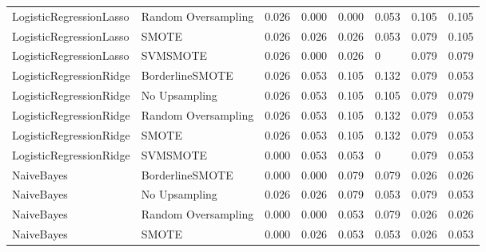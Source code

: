 \begin{tabular}{llllllll}
     LogisticRegressionLasso & Random Oversampling & 0.026 &                     0.000 &                 0.000 &                  0.053 &                                   0.105 &    0.105 \\
     LogisticRegressionLasso &               SMOTE & 0.026 &                     0.026 &                 0.026 &                  0.053 &                                   0.079 &    0.105 \\
     LogisticRegressionLasso &            SVMSMOTE & 0.026 &                     0.000 &                 0.026 &                      0 &                                   0.079 &    0.079 \\
     LogisticRegressionRidge &     BorderlineSMOTE & 0.026 &                     0.053 &                 0.105 &                  0.132 &                                   0.079 &    0.053 \\
     LogisticRegressionRidge &       No Upsampling & 0.026 &                     0.053 &                 0.105 &                  0.105 &                                   0.079 &    0.079 \\
     LogisticRegressionRidge & Random Oversampling & 0.026 &                     0.053 &                 0.105 &                  0.132 &                                   0.079 &    0.053 \\
     LogisticRegressionRidge &               SMOTE & 0.026 &                     0.053 &                 0.105 &                  0.132 &                                   0.079 &    0.053 \\
     LogisticRegressionRidge &            SVMSMOTE & 0.000 &                     0.053 &                 0.053 &                      0 &                                   0.079 &    0.053 \\
                  NaiveBayes &     BorderlineSMOTE & 0.000 &                     0.000 &                 0.079 &                  0.079 &                                   0.026 &    0.026 \\
                  NaiveBayes &       No Upsampling & 0.026 &                     0.026 &                 0.079 &                  0.053 &                                   0.079 &    0.053 \\
                  NaiveBayes & Random Oversampling & 0.000 &                     0.000 &                 0.053 &                  0.079 &                                   0.026 &    0.026 \\
                  NaiveBayes &               SMOTE & 0.000 &                     0.026 &                 0.053 &                  0.053 &                                   0.026 &    0.053 \\

\end{tabular}
